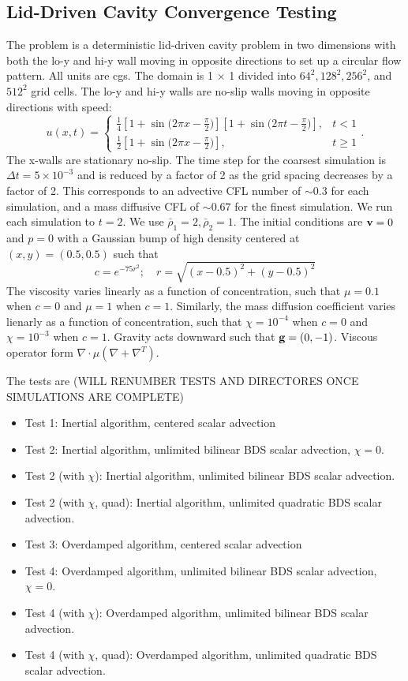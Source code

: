 \documentclass[final]{siamltex}
\def\gb {{\bf g}}
\def\vb {{\bf v}}
\begin{document}
\subsection{Lid-Driven Cavity Convergence Testing}
The problem is a deterministic lid-driven cavity problem in two dimensions with 
both the lo-y and hi-y wall moving in opposite directions to set up a circular 
flow pattern.  All units are cgs.
The domain is 1 $\times$ 1 divided into $64^2, 128^2, 256^2$, and $512^2$
grid cells.  The lo-y and hi-y walls are no-slip walls moving in opposite directions
with speed:
\begin{equation}
u(x,t) =
\begin{cases}
\frac{1}{4}\left[1 + \sin{(2\pi x - \frac{\pi}{2}})\right]
           \left[1 + \sin{(2\pi t - \frac{\pi}{2}})\right], & t < 1\\
\frac{1}{2}\left[1 + \sin{(2\pi x - \frac{\pi}{2}})\right], & t \ge 1
\end{cases}.
\end{equation}
The x-walls are stationary no-slip.  The time step for the coarsest simulation is
$\Delta t=5\times 10^{-3}$ and is reduced by a factor of 2 as the grid spacing
decreases by a factor of 2.
This corresponds to an advective CFL number of $\sim 0.3$ for each simulation, and
a mass diffusive CFL of $\sim 0.67$ for the finest simulation.
We run each simulation to $t=2$.
We use $\bar\rho_1 = 2, \bar\rho_2 = 1$.  The initial conditions are $\vb=0$ 
and $p=0$ with
a Gaussian bump of high density centered at $(x,y) = (0.5, 0.5)$ such that
\begin{equation}
c = e^{-75r^2}; \quad r = \sqrt{(x-0.5)^2 + (y-0.5)^2}
\end{equation}
The viscosity varies linearly as a function of concentration, such that $\mu=0.1$
when $c=0$ and $\mu=1$ when $c=1$.  Similarly, the mass diffusion coefficient
varies lienarly as a function of concentration, such that $\chi=10^{-4}$ when $c=0$ and
$\chi=10^{-3}$ when $c=1$.  Gravity acts downward such that $\gb=(0,-1)$.
Viscous operator form $\nabla\cdot\mu(\nabla + \nabla^T)$.

The tests are (WILL RENUMBER TESTS AND DIRECTORES ONCE SIMULATIONS ARE COMPLETE)
\begin{itemize}
\item Test 1: Inertial algorithm, centered scalar advection
\item Test 2: Inertial algorithm, unlimited bilinear BDS scalar advection, $\chi=0$.
\item Test 2 (with $\chi$): Inertial algorithm, unlimited bilinear BDS scalar advection.
\item Test 2 (with $\chi$, quad): Inertial algorithm, unlimited quadratic BDS scalar advection.
\item Test 3: Overdamped algorithm, centered scalar advection
\item Test 4: Overdamped algorithm, unlimited bilinear BDS scalar advection, $\chi=0$.
\item Test 4 (with $\chi$): Overdamped algorithm, unlimited bilinear BDS scalar advection.
\item Test 4 (with $\chi$, quad): Overdamped algorithm, unlimited quadratic BDS scalar advection.
\end{itemize}
\end{document}
